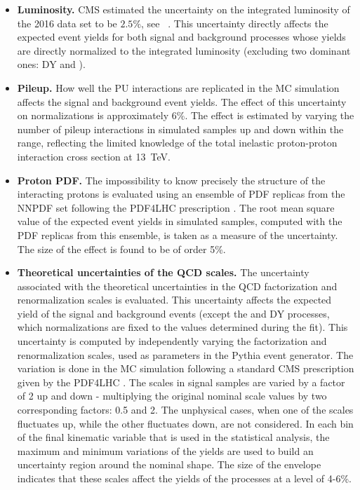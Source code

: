 \begin{itemize}

\item{\bf Luminosity.} 
CMS estimated the uncertainty on the integrated luminosity of the 2016 data set to be $2.5\%$, see ~\cite{CMS-PAS-LUM-17-001}. This uncertainty directly affects the expected event yields for both signal and background processes whose yields are directly normalized to the integrated luminosity (excluding two dominant ones: DY and \ttbar).

\item{\bf Pileup.} 
How well the PU interactions are replicated in the MC simulation affects the signal and background event yields. The effect of this uncertainty on normalizations is approximately 6\%. The effect is estimated by varying the number of pileup interactions in simulated samples up and down within the range, reflecting the limited knowledge of the total inelastic proton-proton interaction cross section at 13~TeV. 

\item{\bf Proton PDF.} 
The impossibility to know precisely the structure of the interacting protons is evaluated using an ensemble of PDF replicas from the NNPDF set \cite{Ball:2014uwa} following the PDF4LHC prescription \cite{Botje:2011sn,Alekhin:2011sk}. The root mean square value of the expected event yields in simulated samples, computed with the PDF replicas from this ensemble, is taken as a measure of the uncertainty. The size of the effect is found to be of order 5\%. 

\item{\bf Theoretical uncertainties of the QCD scales.} 
The uncertainty associated with the theoretical uncertainties in the QCD factorization and renormalization scales is evaluated. This uncertainty affects the expected yield of the signal and background events (except the \ttbar and DY processes, which normalizations are fixed to the values determined during the fit). This uncertainty is computed by independently varying the factorization and renormalization scales, used as parameters in the Pythia event generator. The variation is done in the MC simulation following a standard CMS prescription given by the PDF4LHC \cite{Butterworth:2015oua}. The scales in signal samples are varied by a factor of 2 up and down - multiplying the original nominal scale values by two corresponding factors: 0.5 and 2. The unphysical cases, when one of the scales fluctuates up, while the other fluctuates down, are not considered. In each bin of the final kinematic variable that is used in the statistical analysis, the maximum and minimum variations of the yields are used to build an uncertainty region around the nominal shape. The size of the envelope indicates that these scales affect the yields of the processes at a level of 4-6\%.


\end{itemize}
